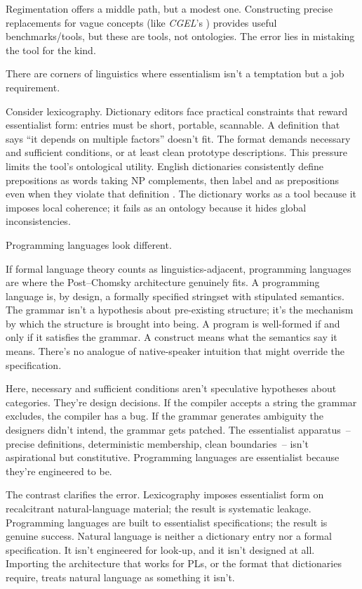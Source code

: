 Regimentation offers a middle path, but a modest one. Constructing precise replacements for vague concepts (like \textit{CGEL}'s ) provides useful benchmarks/tools, but these are tools, not ontologies. The error lies in mistaking the tool for the kind.

There are corners of linguistics where essentialism isn't a temptation but a job requirement.

Consider lexicography. Dictionary editors face practical constraints that reward essentialist form: entries must be short, portable, scannable. A definition that says \enquote{it depends on multiple factors} doesn't fit. The format demands necessary and sufficient conditions, or at least clean prototype descriptions. This pressure limits the tool's ontological utility. English dictionaries consistently define prepositions as words taking NP complements, then label  and  as prepositions even when they violate that definition \autocite{Reynolds2025}. The dictionary works as a tool because it imposes local coherence; it fails as an ontology because it hides global inconsistencies.

Programming languages look different.

If formal language theory counts as linguistics-adjacent, programming languages are where the Post--Chomsky architecture genuinely fits. A programming language is, by design, a formally specified stringset with stipulated semantics. The grammar isn't a hypothesis about pre-existing structure; it's the mechanism by which the structure is brought into being. A program is well-formed if and only if it satisfies the grammar. A construct means what the semantics say it means. There's no analogue of native-speaker intuition that might override the specification.

Here, necessary and sufficient conditions aren't speculative hypotheses about categories. They're design decisions. If the compiler accepts a string the grammar excludes, the compiler has a bug. If the grammar generates ambiguity the designers didn't intend, the grammar gets patched. The essentialist apparatus~-- precise definitions, deterministic membership, clean boundaries~-- isn't aspirational but constitutive. Programming languages are essentialist because they're engineered to be.

The contrast clarifies the error. Lexicography imposes essentialist form on recalcitrant natural-language material; the result is systematic leakage. Programming languages are built to essentialist specifications; the result is genuine success. Natural language is neither a dictionary entry nor a formal specification. It isn't engineered for look-up, and it isn't designed at all. Importing the architecture that works for PLs, or the format that dictionaries require, treats natural language as something it isn't.



